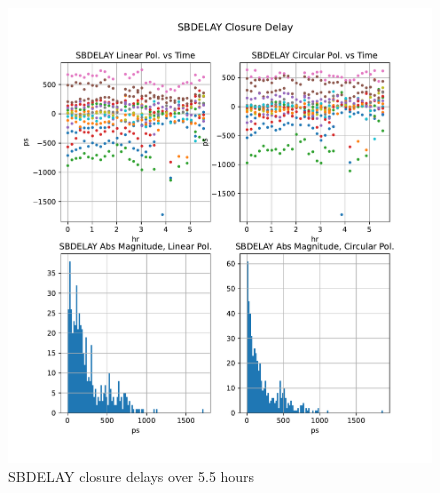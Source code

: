 \documentclass[letterpaper,twoside,12pt]{article}
\begin{document}
\begin{figure}[ht!]
  \begin{center}
  \includegraphics[width=40pc]{SBDELAY_Closure_Delay.pdf}
  \caption{\small SBDELAY closure delays over 5.5 hours }
  \label{mbd}
  \end{center}
\end{figure}
\end{document}
